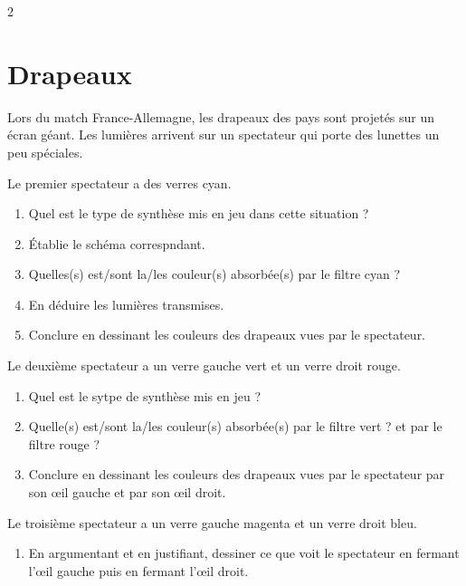 \documentclass[a4paper,11pt,fleqn]{article}%
\begin{document}
\begin{multicols}{2}
\section{Drapeaux}
Lors du match France-Allemagne, les drapeaux des pays sont projetés sur un écran géant. Les lumières arrivent sur un spectateur qui porte des lunettes un peu spéciales.\\
\begin{center}
\end{center}
Le premier spectateur a des verres cyan.
\begin{enumerate}
    \item Quel est le type de synthèse mis en jeu dans cette situation ?
    \item Établie le schéma correspndant.
    \item Quelles(s) est/sont la/les couleur(s) absorbée(s) par le filtre cyan ?
    \item En déduire les lumières transmises.
    \item Conclure en dessinant les couleurs des drapeaux vues par le spectateur.
\end{enumerate}

Le deuxième spectateur a un verre gauche vert et un verre droit rouge.
\begin{enumerate}
    \item Quel est le sytpe de synthèse mis en jeu ?
    \item Quelle(s) est/sont la/les couleur(s) absorbée(s) par le filtre vert ? et par le filtre rouge ?
    \item Conclure en dessinant les couleurs des drapeaux vues par le spectateur par son \oe il gauche et par son \oe il droit.
\end{enumerate}
Le troisième spectateur a un verre gauche magenta et un verre droit bleu.
\begin{enumerate}
    \item En argumentant et en justifiant, dessiner ce que voit le spectateur en fermant l'\oe il gauche puis en fermant l'\oe il droit.
\end{enumerate}
\end{multicols}
\end{document}
